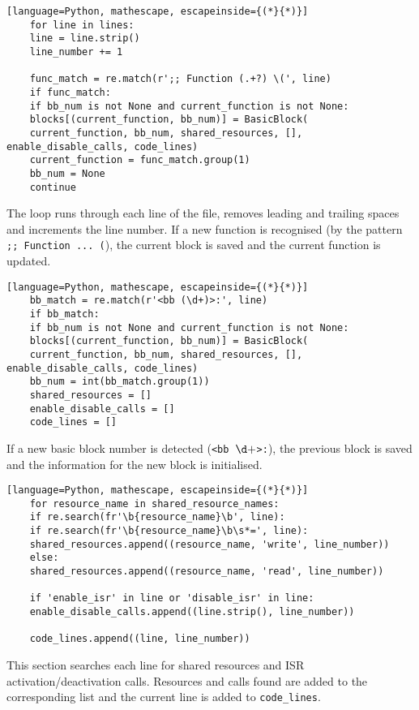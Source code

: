 \documentclass[
fancyheadings, %
%
%
]{stsreprt}
\begin{document}
{\begin{lstlisting}[language=Python, mathescape, escapeinside={(*}{*)}]
	for line in lines:
	line = line.strip()
	line_number += 1
	
	func_match = re.match(r';; Function (.+?) \(', line)
	if func_match:
	if bb_num is not None and current_function is not None:
	blocks[(current_function, bb_num)] = BasicBlock(
	current_function, bb_num, shared_resources, [], enable_disable_calls, code_lines)
	current_function = func_match.group(1)
	bb_num = None
	continue
\end{lstlisting}

The loop runs through each line of the file, removes leading and trailing spaces and increments the line number. If a new function is recognised (by the pattern \texttt{;; Function ... (}), the current block is saved and the current function is updated.

\begin{lstlisting}[language=Python, mathescape, escapeinside={(*}{*)}]
	bb_match = re.match(r'<bb (\d+)>:', line)
	if bb_match:
	if bb_num is not None and current_function is not None:
	blocks[(current_function, bb_num)] = BasicBlock(
	current_function, bb_num, shared_resources, [], enable_disable_calls, code_lines)
	bb_num = int(bb_match.group(1))
	shared_resources = []
	enable_disable_calls = []
	code_lines = []
\end{lstlisting}

If a new basic block number is detected (\texttt{<bb \(\d+\)>:}), the previous block is saved and the information for the new block is initialised.

\begin{lstlisting}[language=Python, mathescape, escapeinside={(*}{*)}]
	for resource_name in shared_resource_names:
	if re.search(fr'\b{resource_name}\b', line):
	if re.search(fr'\b{resource_name}\b\s*=', line):
	shared_resources.append((resource_name, 'write', line_number))
	else:
	shared_resources.append((resource_name, 'read', line_number))
	
	if 'enable_isr' in line or 'disable_isr' in line:
	enable_disable_calls.append((line.strip(), line_number))
	
	code_lines.append((line, line_number))
\end{lstlisting}

This section searches each line for shared resources and ISR activation/deactivation calls. Resources and calls found are added to the corresponding list and the current line is added to \texttt{code\_lines}.

}
\end{document}
